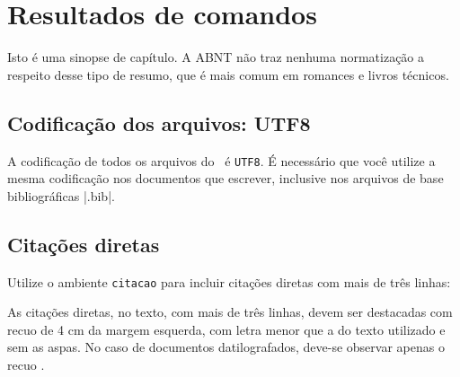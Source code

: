 
 
\chapter{Resultados de comandos}\label{cap_exemplos}

Isto é uma sinopse de capítulo. A ABNT não traz nenhuma
normatização a respeito desse tipo de resumo, que é mais comum em romances 
e livros técnicos.

\section{Codificação dos arquivos: UTF8}

A codificação de todos os arquivos do \abnTeX\ é \texttt{UTF8}. É necessário que
você utilize a mesma codificação nos documentos que escrever, inclusive nos
arquivos de base bibliográficas |.bib|.

\section{Citações diretas}
\label{sec-citacao}

Utilize o ambiente \texttt{citacao} para incluir
citações diretas com mais de três linhas:

\begin{citacao}
As citações diretas, no texto, com mais de três linhas, devem ser
destacadas com recuo de 4 cm da margem esquerda, com letra menor que a do texto
utilizado e sem as aspas. No caso de documentos datilografados, deve-se
observar apenas o recuo \cite[5.3]{NBR10520:2002}.
\end{citacao}

